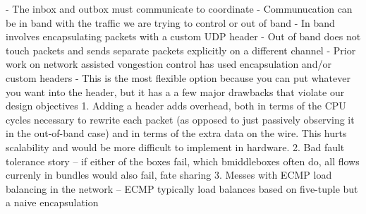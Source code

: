 - The inbox and outbox must communicate to coordinate
- Communucation can be in band with the traffic we are trying to control or out of band
    - In band involves encapsulating packets with a custom UDP header
    - Out of band does not touch packets and sends separate packets explicitly on a different channel
- Prior work on network assisted vongestion control has used encapsulation and/or custom headers 
- This is the most flexible option because you can put whatever you want into the header, but it has a 
a few major drawbacks that violate our design objectives
    1. Adding a header adds overhead, both in terms of the CPU cycles necessary to rewrite each packet
    (as opposed to just passively observing it in the out-of-band case) and in terms of the extra data
    on the wire. This hurts scalability and would be more difficult to implement in hardware.
    2. Bad fault tolerance story -- if either of the boxes fail, which bmiddleboxes often do, 
    all flows currenly in bundles would also fail, fate sharing
    3. Messes with ECMP load balancing in the network -- ECMP typically load balances based on five-tuple
    but a naive encapsulation 

